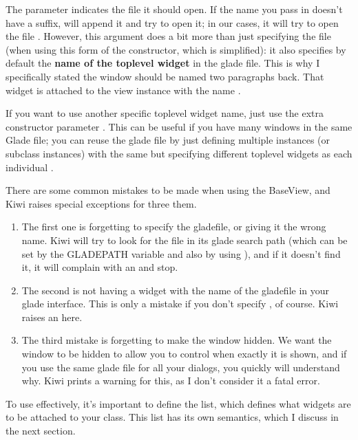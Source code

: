 \documentclass[a4paper]{howto}
\begin{document}
The  parameter indicates the file it should open. If the
name you pass in doesn't have a  suffix, 
will append it and try to open it; in our cases, it will try to open the
file .  However, this argument does a bit more than just
specifying the file (when using this form of the constructor, which is
simplified): it also specifies by default the {\bf name of the toplevel
widget} in the glade file. This is why I specifically stated the window
should be named  two paragraphs back. That widget is attached
to the view instance with the name .

If you want to use another specific toplevel widget name, just use the
extra constructor parameter . This can be useful
if you have many windows in the same Glade file; you can reuse the glade
file by just defining multiple  instances (or subclass
instances) with the same  but specifying different
toplevel widgets as each individual .

There are some common mistakes to be made when using the BaseView, and
Kiwi raises special exceptions for three them.

\begin{enumerate}
\item The first one is forgetting to specify the gladefile, or giving it
the wrong name. Kiwi will try to look for the file in its glade search
path (which can be set by the GLADEPATH variable and also by using
), and if it doesn't find it, it will
complain with an  and stop.
\item The second is not having a widget with the name of the gladefile
in your glade interface. This is only a mistake if you don't specify
, of course. Kiwi raises an
 here.
\item The third mistake is forgetting to make the window hidden. We want
the window to be hidden to allow you to control when exactly it is
shown, and if you use the same glade file for all your dialogs, you
quickly will understand why. Kiwi prints a warning for this, as I
don't consider it a fatal error.
\end{enumerate}

To use  effectively, it's important to define the
 list, which defines what widgets are to be attached to
your class. This list has its own semantics, which I discuss in the next
section.
\end{document}
